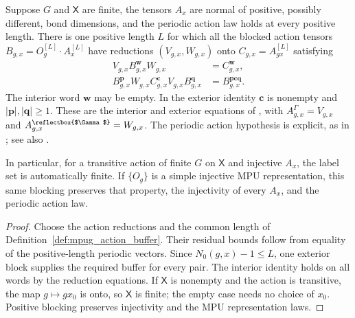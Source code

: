 \begin{lemma}
    \label{lem:mpug_action_common_blocking}
    \leanok
    Suppose $G$ and $\mathsf X$ are finite, the tensors $A_x$ are normal
    of positive, possibly different, bond dimensions, and the periodic
    action law holds at every positive length. There is one positive
    length $L$ for which all the blocked action tensors
    $B_{g,x}=O_g^{[L]}\cdot A_x^{[L]}$ have reductions
    $(V_{g,x},W_{g,x})$ onto $C_{g,x}=A_{gx}^{[L]}$ satisfying
    \begin{align}
        V_{g,x}B_{g,x}^{\mathbf w}W_{g,x}
         & =C_{g,x}^{\mathbf w},
        \label{eq:mpug_action_interior}            \\
        B_{g,x}^{\mathbf p}W_{g,x}C_{g,x}^{\mathbf c}
        V_{g,x}B_{g,x}^{\mathbf q}
         & =B_{g,x}^{\mathbf p\mathbf c\mathbf q}.
        \label{eq:mpug_action_exterior}
    \end{align}
    The interior word $\mathbf w$ may be empty. In the exterior identity
    $\mathbf c$ is nonempty and $|\mathbf p|,|\mathbf q|\geq1$.
    These are the interior and exterior equations of
    \cite[lines~1782--1873]{FrancoRubio2025MPUGauging}, with
    $A^\Gamma_{g,x}=V_{g,x}$ and
    $A^{\text{\reflectbox{$\Gamma$}}}_{g,x}=W_{g,x}$.
    The periodic action hypothesis is explicit, as in
    \cite[line~1064]{GarreRubio2023MPOSym}; see also
    \cite{gap:fbc25_mpu_action_stabilizer_source_audit}.

    In particular, for a transitive action of finite $G$ on $\mathsf X$
    and injective $A_x$, the label set is automatically finite. If
    $\{O_g\}$ is a simple injective MPU representation, this same blocking
    preserves that property, the injectivity of every $A_x$, and the
    periodic action law.
\end{lemma}

\begin{proof}\leanok
    Choose the action reductions and the common length of
    Definition~\ref{def:mpug_action_buffer}. Their residual bounds follow
    from equality of the positive-length periodic vectors. Since
    $N_0(g,x)-1\leq L$, one exterior block supplies the required buffer
    for every pair. The interior identity holds on all words by the
    reduction equations. If $\mathsf X$ is nonempty and the action is
    transitive, the map $g\mapsto gx_0$ is onto, so $\mathsf X$ is finite;
    the empty case needs no choice of $x_0$. Positive blocking preserves
    injectivity and the MPU representation laws.
\end{proof}

